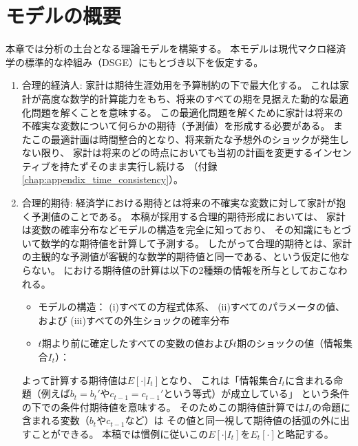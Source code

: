 
\section{モデルの概要}
\label{sec:model_overview}

本章では分析の土台となる理論モデルを構築する。
本モデルは現代マクロ経済学の標準的な枠組み（DSGE）にもとづき以下を仮定する。

\begin{enumerate}
    \item 合理的経済人:
    家計は期待生涯効用を予算制約の下で最大化する。
    これは家計が高度な数学的計算能力をもち、将来のすべての期を見据えた動的な最適化問題を解くことを意味する。
    この最適化問題を解くために家計は将来の不確実な変数について何らかの期待（予測値）を形成する必要がある。
    またこの最適計画は時間整合的となり、将来新たな予想外のショックが発生しない限り、
    家計は将来のどの時点においても当初の計画を変更するインセンティブを持たずそのまま実行し続ける
    （付録\ref{chap:appendix_time_consistency}）。
    
    \item 合理的期待:
    経済学における期待とは将来の不確実な変数に対して家計が抱く予測値のことである。
    本稿が採用する合理的期待形成においては、
    家計は変数の確率分布などモデルの構造を完全に知っており、
    その知識にもとづいて数学的な期待値を計算して予測する。
    したがって合理的期待とは、家計の主観的な予測値が客観的な数学的期待値と同一である、という仮定に他ならない。
    における期待値の計算は以下の2種類の情報を所与としておこなわれる。
    \begin{itemize}
        \item[a.] モデルの構造： 
        (i)すべての方程式体系、
        (ii)すべてのパラメータの値、および
        (iii)すべての外生ショックの確率分布
        \item[b.] \(t\)期より前に確定したすべての変数の値および\(t\)期のショックの値（情報集合\(I_t\)）： 
    \end{itemize}
    よって計算する期待値は\(E[\cdot|I_t]\)となり、
    これは「情報集合\(I_t\)に含まれる命題（例えば\(b_t=b_t'\)や\(c_{t-1}=c_{t-1}'\)という等式）が成立している」
    という条件の下での条件付期待値を意味する。
    そのためこの期待値計算では\(I_t\)の命題に含まれる変数（\(b_t\)や\(c_{t-1}\)など）は
    その値と同一視して期待値の括弧の外に出すことができる。
    本稿では慣例に従いこの\(E[\cdot|I_t]\)を\(E_t[\cdot]\)と略記する。
\end{enumerate}

